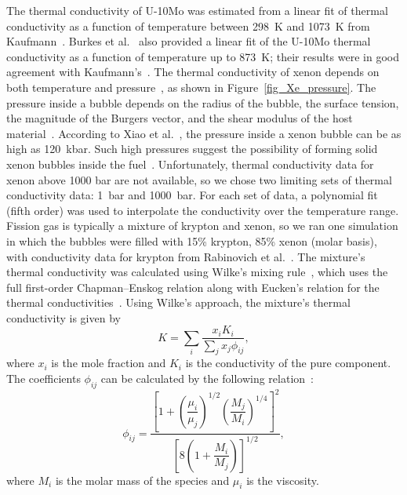 The thermal conductivity of U-10Mo was estimated from a linear fit of thermal conductivity as a function of temperature between 298~K and 1073~K from Kaufmann~\cite{kaufmann1962nuclear}. Burkes et al.~\cite{burkes2010thermo} also provided a linear fit of the U-10Mo thermal conductivity as a function of temperature up to 873~K; their results were in good agreement with Kaufmann's~\cite{kaufmann1962nuclear}. The thermal conductivity of xenon depends on both temperature and pressure~\cite{rabinovich1987thermophysical}, as shown in Figure~\ref{fig_Xe_pressure}. The pressure inside a bubble depends on the radius of the bubble, the surface tension, the magnitude of the Burgers vector, and the shear modulus of the host material~\cite{greenwood1959role,trinkaus1983energetics}. According to Xiao et al.~\cite{xiao2015atomistic}, the pressure inside a xenon bubble can be as high as 120~kbar. Such high pressures suggest the possibility of forming solid xenon bubbles inside the fuel~\cite{thomas1991condensed,ross1980condensed,zheng2014thermodynamics}. Unfortunately, thermal conductivity data for xenon above 1000 bar are not available, so we chose two limiting sets of thermal conductivity data: 1~bar and 1000~bar. For each set of data, a polynomial fit (fifth order) was used to interpolate the conductivity over the temperature range.
{Fission gas is typically a mixture of krypton and xenon, so
we ran one simulation in which the bubbles were filled with 15\% krypton,
85\% xenon (molar basis), with conductivity data for krypton from Rabinovich et al.~\cite{rabinovich1987thermophysical}. The mixture's thermal conductivity was calculated using Wilke's mixing rule~\cite{wilke1950viscosity}, which uses the full first-order Chapman--Enskog relation along with Eucken's relation for the thermal conductivities~\cite{vincenti1965introduction, alkandry2013comparison}. Using Wilke's approach, the mixture's thermal conductivity is given by
\begin{equation}
  K = \sum_i \frac{x_iK_i}{\sum_j x_j \phi_{ij}},
  \label{eq:K-mixture}
\end{equation}
where $x_i$ is the mole fraction and $K_i$ is the conductivity of the pure
component. The coefficients $\phi_{ij}$ can be calculated by the following
relation~\cite{alkandry2013comparison}:
\begin{equation}
  \phi_{ij} = \frac{\left[1+\left(\dfrac{\mu_i}{\mu_j}\right)^{\!\!1/2}\left(\dfrac{M_j}{M_i}\right)^{\!\!1/4}\right]^2}{\left[
    8\left(1+\dfrac{M_i}{M_j}\right)
  \right]^{1/2}},
\end{equation}
where $M_i$ is the molar mass of the species and $\mu_i$ is the viscosity.
}

